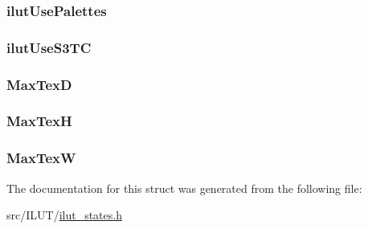 \hypertarget{struct_i_l_u_t___s_t_a_t_e_s_ac71abb5cbd432cef194b3b3d000c4185}{
\subsubsection[{ilut\-Use\-Palettes}]{ ilut\-Use\-Palettes}}\label{struct_i_l_u_t___s_t_a_t_e_s_ac71abb5cbd432cef194b3b3d000c4185}
\hypertarget{struct_i_l_u_t___s_t_a_t_e_s_ae5197b9b4b6ee5ce6ed592eafaf7e1dc}{
\subsubsection[{ilut\-Use\-S3\-T\-C}]{ ilut\-Use\-S3\-T\-C}}\label{struct_i_l_u_t___s_t_a_t_e_s_ae5197b9b4b6ee5ce6ed592eafaf7e1dc}
\hypertarget{struct_i_l_u_t___s_t_a_t_e_s_a4ba9aef2cbb6c16272ddb64e6f903b4b}{
\subsubsection[{Max\-Tex\-D}]{ Max\-Tex\-D}}\label{struct_i_l_u_t___s_t_a_t_e_s_a4ba9aef2cbb6c16272ddb64e6f903b4b}
\hypertarget{struct_i_l_u_t___s_t_a_t_e_s_a047e805b0d8d06830ded67aacec42e1c}{
\subsubsection[{Max\-Tex\-H}]{ Max\-Tex\-H}}\label{struct_i_l_u_t___s_t_a_t_e_s_a047e805b0d8d06830ded67aacec42e1c}
\hypertarget{struct_i_l_u_t___s_t_a_t_e_s_ae4681c495d7f70056d555c8d309ec6bf}{
\subsubsection[{Max\-Tex\-W}]{ Max\-Tex\-W}}\label{struct_i_l_u_t___s_t_a_t_e_s_ae4681c495d7f70056d555c8d309ec6bf}


The documentation for this struct was generated from the following file\-:\begin{DoxyCompactItemize}
\item 
src/\-I\-L\-U\-T/\hyperlink{ilut__states_8h}{ilut\-\_\-states.\-h}\end{DoxyCompactItemize}
